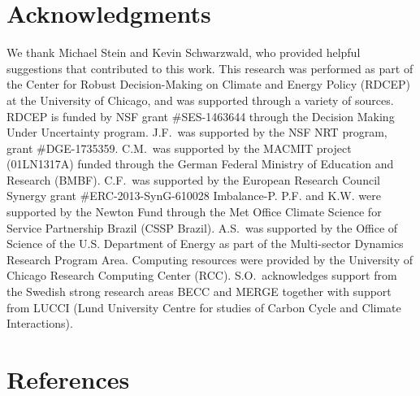 \documentclass[preprint, 5p, times, twocolumn]{elsarticle}
\begin{document}


\section{Acknowledgments}
\label{S:5}
We thank Michael Stein and Kevin Schwarzwald, who provided helpful suggestions that contributed to this work. This research was performed as part of the Center for Robust Decision-Making on Climate and Energy Policy (RDCEP) at the University of Chicago, and was supported through a variety of sources. RDCEP is funded by NSF grant \#SES-1463644 through the Decision Making Under Uncertainty program. J.F.\ was supported by the NSF NRT program, grant \#DGE-1735359. C.M.\ was supported by the MACMIT project (01LN1317A) funded through the German Federal Ministry of Education and Research (BMBF).  C.F.\ was supported by the European Research Council Synergy grant \#ERC-2013-SynG-610028 Imbalance-P. P.F. and K.W. were supported  by the Newton Fund through the Met Office Climate Science for Service Partnership Brazil (CSSP Brazil). A.S.\ was supported by the Office of Science of the U.S. Department of Energy as part of the Multi-sector Dynamics Research Program Area. Computing resources were provided by the University of Chicago Research Computing Center (RCC). S.O.\ acknowledges support from the Swedish strong research areas BECC and MERGE together with support from LUCCI (Lund University Centre for studies of Carbon Cycle and Climate Interactions).
\section{References}
\label{S:6}




\end{document}

